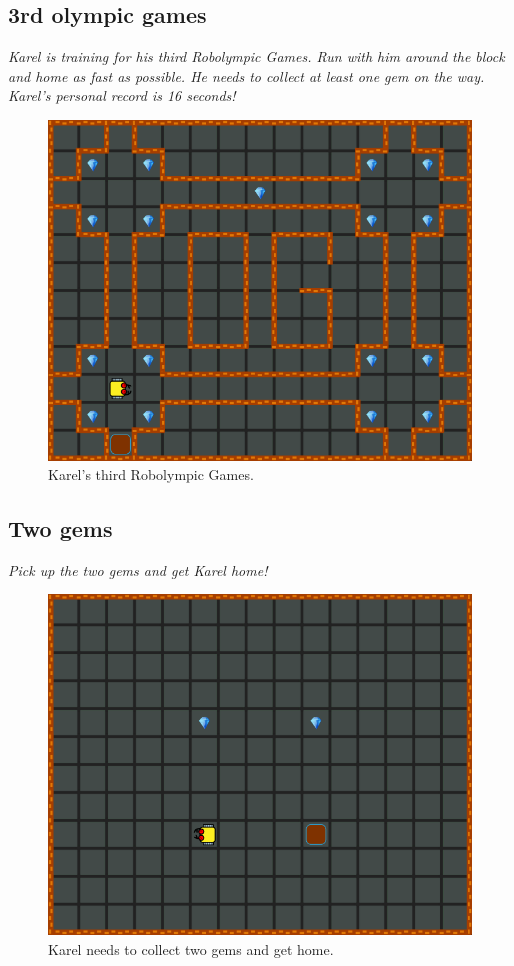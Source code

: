\subsection{3rd olympic games}

{\em Karel is training for his third Robolympic Games. Run with him around the block and home as fast as possible. He needs to collect at least one gem on the way. Karel's personal record is 16 seconds!}

\begin{figure}[!ht]
\begin{center}
\includegraphics[height=0.4\textwidth]{img/a06.png}
\end{center}
\vspace{-4mm}
\caption{Karel's third Robolympic Games.}
\label{fig:a06}
\vspace{-1cm}
\end{figure}
\noindent


\subsection{Two gems}

{\em Pick up the two gems and get Karel home!}

\begin{figure}[!ht]
\begin{center}
\includegraphics[height=0.4\textwidth]{img/a07.png}
\end{center}
\vspace{-4mm}
\caption{Karel needs to collect two gems and get home.}
\label{fig:a07}
\vspace{-1cm}
\end{figure}
\noindent

